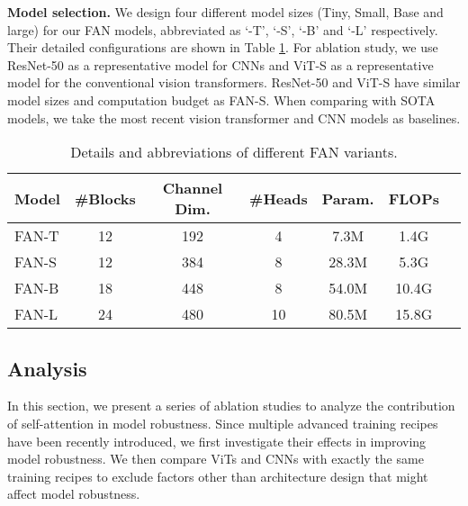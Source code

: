 \documentclass[nohyperref]{article}
\theoremstyle{plain}
\theoremstyle{definition}
\theoremstyle{remark}
\begin{document}
\textbf{Model selection.}
We design four different model sizes (Tiny, Small, Base and large) for our FAN models, abbreviated as `-T', `-S',  `-B' and `-L' respectively. Their detailed configurations are shown in Table \ref{tab:model_arch}. For ablation study, we use ResNet-50 as a representative model for CNNs and ViT-S as a representative model for the conventional vision transformers. ResNet-50 and ViT-S have similar model sizes and computation budget as FAN-S. When comparing with SOTA models, we take the most recent vision transformer and CNN models as baselines. 
\vspace{-3mm}
\begin{table}[h]
    \small
    \caption{Details and abbreviations of different FAN variants.}
    \label{tab:model_arch}
    \vspace{2mm}
    \centering
    \setlength{\tabcolsep}{3pt}
    \begin{tabular}{l|cccccc}  
    Model      & \#Blocks  & Channel Dim. &  \#Heads & Param. & FLOPs \\ 
    \midrule
    FAN-T & 12 & 192 & 4 &   7.3M  &   1.4G    \\  
    FAN-S & 12 & 384  & 8 &  28.3M  &   5.3G    \\ 
    FAN-B & 18  & 448 & 8 &  54.0M  &   10.4G    \\ 
    FAN-L & 24  & 480 & 10 &  80.5M  &  15.8G     \\ 
    \end{tabular}
\end{table}

\vspace{-5mm}
\subsection{Analysis}
\label{exp:analysis}
In this section, we present a series of ablation studies to analyze the contribution of self-attention in model robustness. Since multiple advanced training recipes have been recently introduced,  we first investigate their effects in improving model robustness. We then compare ViTs and CNNs with exactly the same training recipes to  exclude factors other than architecture design that might affect model robustness. 
\end{document}

